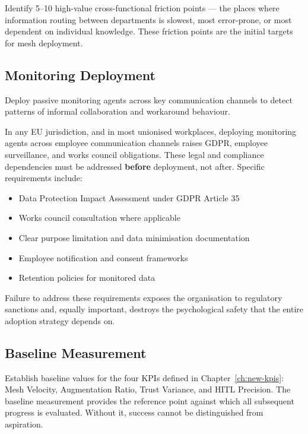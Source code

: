 Identify 5--10 high-value cross-functional friction points --- the places where information routing between departments is slowest, most error-prone, or most dependent on individual knowledge. These friction points are the initial targets for mesh deployment.

\subsection{Monitoring Deployment}

Deploy passive monitoring agents across key communication channels to detect patterns of informal collaboration and workaround behaviour.

\begin{cautionbox}[title={Legal and Compliance Dependencies}]
In any EU jurisdiction, and in most unionised workplaces, deploying monitoring agents across employee communication channels raises GDPR, employee surveillance, and works council obligations. These legal and compliance dependencies must be addressed \textbf{before} deployment, not after. Specific requirements include:
\begin{itemize}
  \item Data Protection Impact Assessment under GDPR Article 35
  \item Works council consultation where applicable
  \item Clear purpose limitation and data minimisation documentation
  \item Employee notification and consent frameworks
  \item Retention policies for monitored data
\end{itemize}
Failure to address these requirements exposes the organisation to regulatory sanctions and, equally important, destroys the psychological safety that the entire adoption strategy depends on.
\end{cautionbox}

\subsection{Baseline Measurement}

Establish baseline values for the four KPIs defined in Chapter~\ref{ch:new-kpis}: Mesh Velocity, Augmentation Ratio, Trust Variance, and HITL Precision. The baseline measurement provides the reference point against which all subsequent progress is evaluated. Without it, success cannot be distinguished from aspiration.

